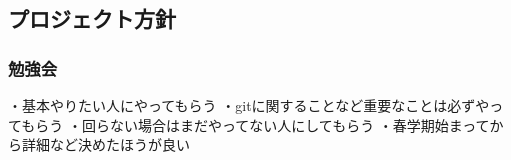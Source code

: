 \subsection*{プロジェクト方針}


\subsubsection*{勉強会}
・基本やりたい人にやってもらう
・gitに関することなど重要なことは必ずやってもらう
・回らない場合はまだやってない人にしてもらう
・春学期始まってから詳細など決めたほうが良い
